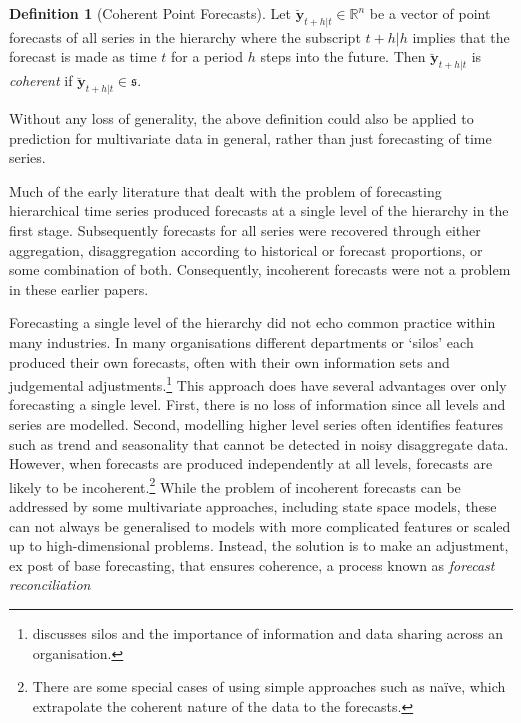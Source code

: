 \documentclass[12pt]{article}
\theoremstyle{definition}
\newtheorem{definition}{Definition}[section]
\begin{document}
\begin{definition}[Coherent Point Forecasts]\label{def:cohpoint}
  Let $\breve{\bm{y}}_{t+h|t} \in \mathbb{R}^n$ be a vector of point forecasts of all series in the hierarchy where the subscript $t+h|h$ implies that the forecast is made as time $t$ for a period $h$ steps into the future. Then $\breve{\bm{y}}_{t+h|t}$ is \emph{coherent} if $\breve{\bm{y}}_{t+h|t} \in \mathfrak{s}$.
\end{definition}

Without any loss of generality, the above definition could also be applied to prediction for multivariate data in general, rather than just forecasting of time series.

Much of the early literature that dealt with the problem of forecasting hierarchical time series \citep[see][and references therein]{Gross1990} produced forecasts at a single level of the hierarchy in the first stage. Subsequently forecasts for all series were recovered through {\color{blue} either} aggregation, disaggregation according to historical or forecast proportions, or some combination of both. Consequently, incoherent forecasts were not a problem in these earlier papers.

Forecasting a single level of the hierarchy did not echo common practice within many industries. In many organisations different departments or `silos' each produced their own forecasts, often with their own information sets and judgemental adjustments.\footnote{\citet{Cha2013} discusses silos and the importance of information and data sharing across an organisation.} This approach does have several advantages over only forecasting a single level. First, there is no loss of information since all levels and series are modelled. Second, modelling higher level series often identifies features such as trend and seasonality that cannot be detected in noisy disaggregate data. However, when forecasts are produced independently at all levels, forecasts are likely to be incoherent.\footnote{There are some special cases of using simple approaches such as na\"{i}ve, which extrapolate the coherent nature of the data to the forecasts.} {\color{blue}While the problem of incoherent forecasts can be addressed by some multivariate approaches, including state space models, these can not always be generalised to models with more complicated features or scaled up to high-dimensional problems.}  Instead, the solution is to make an adjustment, {\color{blue}ex post of base forecasting,} that ensures coherence, a process known as \emph{forecast reconciliation}
\end{document}
